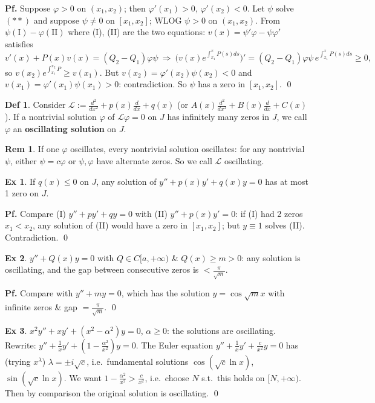 \documentclass[11pt]{article}
\theoremstyle{definition}
\newtheorem*{definition}{Def}
\newtheorem*{exercise}{Ex}
\newtheorem*{remark}{Rem}
\theoremstyle{remark}
\begin{document}
\textbf{Pf.} Suppose $\varphi>0$ on $(x_1,x_2)$; then $\varphi'(x_1)>0$, $\varphi'(x_2)<0$. Let
$\psi$ solve $(**)$ and suppose $\psi\neq0$ on $[x_1,x_2]$; WLOG $\psi>0$ on $(x_1,x_2)$. From
$\psi(\text{I})-\varphi(\text{II})$ where (I), (II) are the two equations:
$v(x)=\psi'\varphi-\psi\varphi'$ satisfies
\[
v'(x)+P(x)v(x)=(Q_2-Q_1)\varphi\psi
\ \Rightarrow\ \bigl(v(x)e^{\int_{x_1}^{x}P(s)ds}\bigr)'=(Q_2-Q_1)\varphi\psi\, e^{\int_{x_1}^{x}P(s)ds}\ge0,
\]
so $v(x_2)e^{\int_{x_1}^{x_2}P}\ge v(x_1)$. But
$v(x_2)=\varphi'(x_2)\psi(x_2)<0$ and $v(x_1)=\varphi'(x_1)\psi(x_1)>0$: contradiction. So $\psi$
has a zero in $[x_1,x_2]$. \qed

\begin{definition}
Consider $\mathcal{L}:=\frac{d^2}{dx^2}+p(x)\frac{d}{dx}+q(x)$ (or
$A(x)\frac{d^2}{dx^2}+B(x)\frac{d}{dx}+C(x)$). If a nontrivial solution $\varphi$ of
$\mathcal{L}\varphi=0$ on $J$ has infinitely many zeros in $J$, we call $\varphi$ an
\textbf{oscillating solution} on $J$.
\end{definition}

\begin{remark}
If one $\varphi$ oscillates, every nontrivial solution oscillates: for any nontrivial $\psi$,
either $\psi=c\varphi$ or $\psi,\varphi$ have alternate zeros. So we call $\mathcal{L}$ oscillating.
\end{remark}

\begin{exercise}
If $q(x)\le0$ on $J$, any solution of $y''+p(x)y'+q(x)y=0$ has at most 1 zero on $J$.

\textbf{Pf.} Compare (I) $y''+py'+qy=0$ with (II) $y''+p(x)y'=0$: if (I) had 2 zeros $x_1<x_2$, any
solution of (II) would have a zero in $[x_1,x_2]$; but $y\equiv1$ solves (II). Contradiction. \qed
\end{exercise}

\begin{exercise}
$y''+Q(x)y=0$ with $Q\in C[a,+\infty)$ \& $Q(x)\ge m>0$: any solution is oscillating, and the gap
between consecutive zeros is $<\frac{\pi}{\sqrt{m}}$.

\textbf{Pf.} Compare with $y''+my=0$, which has the solution $y=\cos\sqrt{m}x$ with infinite zeros
\& gap $=\frac{\pi}{\sqrt{m}}$. \qed
\end{exercise}

\begin{exercise}
$x^2y''+xy'+(x^2-\alpha^2)y=0$, $\alpha\ge0$: the solutions are oscillating.
Rewrite: $y''+\frac1xy'+(1-\frac{\alpha^2}{x^2})y=0$. The Euler equation
$y''+\frac1xy'+\frac{c}{x^2}y=0$ has (trying $x^\lambda$) $\lambda=\pm i\sqrt{c}$, i.e.\ fundamental
solutions $\cos(\sqrt{c}\ln x)$, $\sin(\sqrt{c}\ln x)$. We want
$1-\frac{\alpha^2}{x^2}>\frac{c}{x^2}$, i.e.\ choose $N$ s.t.\ this holds on $[N,+\infty)$. Then by
comparison the original solution is oscillating. \qed
\end{exercise}
\end{document}
